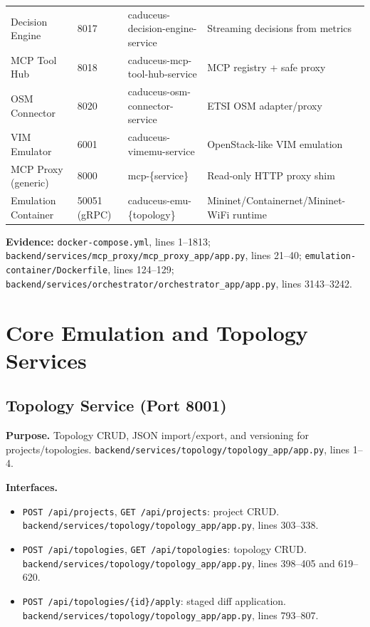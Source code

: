 \documentclass[conference]{IEEEtran}
\begin{document}
\begin{table}[t]
\begin{tabularx}{\textwidth}{p{3.3cm}p{2.1cm}p{4.2cm}Y}
Decision Engine & 8017 & caduceus-decision-engine-service & Streaming decisions from metrics \\
MCP Tool Hub & 8018 & caduceus-mcp-tool-hub-service & MCP registry + safe proxy \\
OSM Connector & 8020 & caduceus-osm-connector-service & ETSI OSM adapter/proxy \\
VIM Emulator & 6001 & caduceus-vimemu-service & OpenStack-like VIM emulation \\
MCP Proxy (generic) & 8000 & mcp-\{service\} & Read-only HTTP proxy shim \\
Emulation Container & 50051 (gRPC) & caduceus-emu-\{topology\} & Mininet/Containernet/Mininet-WiFi runtime \\
\bottomrule
\end{tabularx}
\end{table}

\textbf{Evidence:} \texttt{docker-compose.yml}, lines 1--1813; \texttt{backend/services/mcp\_proxy/mcp\_proxy\_app/app.py}, lines 21--40; \texttt{emulation-container/Dockerfile}, lines 124--129; \texttt{backend/services/orchestrator/orchestrator\_app/app.py}, lines 3143--3242.

\section{Core Emulation and Topology Services}

\subsection{Topology Service (Port 8001)}
\textbf{Purpose.} Topology CRUD, JSON import/export, and versioning for projects/topologies. \texttt{backend/services/topology/topology\_app/app.py}, lines 1--4.

\textbf{Interfaces.}
\begin{itemize}
\item \texttt{POST /api/projects}, \texttt{GET /api/projects}: project CRUD. \texttt{backend/services/topology/topology\_app/app.py}, lines 303--338.
\item \texttt{POST /api/topologies}, \texttt{GET /api/topologies}: topology CRUD. \texttt{backend/services/topology/topology\_app/app.py}, lines 398--405 and 619--620.
\item \texttt{POST /api/topologies/\{id\}/apply}: staged diff application. \texttt{backend/services/topology/topology\_app/app.py}, lines 793--807.
\end{itemize}
\end{document}
